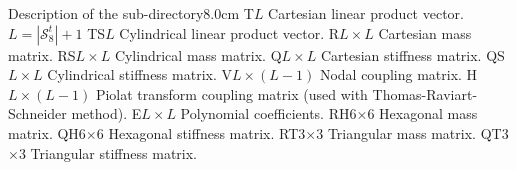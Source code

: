 \begin{DescriptionEnregistrement}{Description of the  sub-directory}{8.0cm}
\RealEnr
  {T}{$L$}{}
  {Cartesian linear product vector. $L=|\mathcal{S}^{t}_{8}|+1$} 
\RealEnr
  {TS}{$L$}{}
  {Cylindrical linear product vector.} 
\RealEnr
  {R}{$L\times L$}{}
  {Cartesian mass matrix.} 
\RealEnr
  {RS}{$L\times L$}{}
  {Cylindrical mass matrix.} 
\RealEnr
  {Q}{$L\times L$}{}
  {Cartesian stiffness matrix.} 
\RealEnr
  {QS}{$L\times L$}{}
  {Cylindrical stiffness matrix.} 
\RealEnr
  {V}{$L\times (L-1)$}{}
  {Nodal coupling matrix.} 
\RealEnr
  {H}{$L\times (L-1)$}{}
  {Piolat transform coupling matrix (used with Thomas-Raviart-Schneider method).} 
\RealEnr
  {E}{$L\times L$}{}
  {Polynomial coefficients.} 
\RealEnr
  {RH}{6$\times$6}{}
  {Hexagonal mass matrix.} 
\RealEnr
  {QH}{6$\times$6}{}
  {Hexagonal stiffness matrix.} 
\RealEnr
  {RT}{3$\times$3}{}
  {Triangular mass matrix.} 
\RealEnr
  {QT}{3$\times$3}{}
  {Triangular stiffness matrix.} 
\end{DescriptionEnregistrement}

\eject
